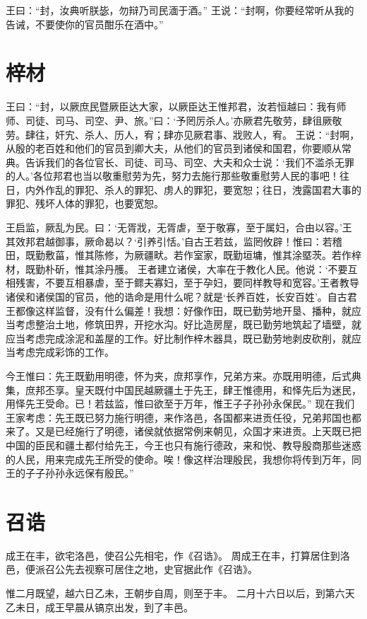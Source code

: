 \documentclass[a4paper,12pt,UTF8,twoside]{ctexbook}
\begin{document}
王曰：“封，汝典听朕毖，勿辩乃司民湎于酒。”
王说：“封啊，你要经常听从我的告诫，不要使你的官员酣乐在酒中。”

\chapter{梓材}

王曰：“封，以厥庶民暨厥臣达大家，以厥臣达王惟邦君，汝若恒越曰：我有师师、司徒、司马、司空、尹、旅。”曰：‘予罔厉杀人。’亦厥君先敬劳，肆徂厥敬劳。肆往，奸宄、杀人、历人，宥；肆亦见厥君事、戕败人，宥。
王说：“封啊，从殷的老百姓和他们的官员到卿大夫，从他们的官员到诸侯和国君，你要顺从常典。告诉我们的各位官长、司徒、司马、司空、大夫和众士说：‘我们不滥杀无罪的人。’各位邦君也当以敬重慰劳为先，努力去施行那些敬重慰劳人民的事吧！往日，内外作乱的罪犯、杀人的罪犯、虏人的罪犯，要宽恕；往日，洩露国君大事的罪犯、残坏人体的罪犯，也要宽恕。

王启监，厥乱为民。曰：‘无胥戕，无胥虐，至于敬寡，至于属妇，合由以容。’王其效邦君越御事，厥命曷以？‘引养引恬。’自古王若兹，监罔攸辟！惟曰：若稽田，既勤敷菑，惟其陈修，为厥疆畎。若作室家，既勤垣墉，惟其涂塈茨。若作梓材，既勤朴斫，惟其涂丹雘。
王者建立诸侯，大率在于教化人民。他说：‘不要互相残害，不要互相暴虐，至于鳏夫寡妇，至于孕妇，要同样教导和宽容。’王者教导诸侯和诸侯国的官员，他的诰命是用什么呢？就是‘长养百姓，长安百姓’。自古君王都像这样监督，没有什么偏差！我想：好像作田，既已勤劳地开垦、播种，就应当考虑整治土地，修筑田界，开挖水沟。好比造房屋，既已勤劳地筑起了墙壁，就应当考虑完成涂泥和盖屋的工作。好比制作梓木器具，既已勤劳地剥皮砍削，就应当考虑完成彩饰的工作。

今王惟曰：先王既勤用明德，怀为夹，庶邦享作，兄弟方来。亦既用明德，后式典集，庶邦丕享。皇天既付中国民越厥疆土于先王，肆王惟德用，和怿先后为迷民，用怿先王受命。已！若兹监，惟曰欲至于万年，惟王子子孙孙永保民。”
现在我们王家考虑：先王既已努力施行明德，来作洛邑，各国都来进贡任役，兄弟邦国也都来了。又是已经施行了明德，诸侯就依据常例来朝见，众国才来进贡。上天既已把中国的臣民和疆土都付给先王，今王也只有施行德政，来和悦、教导殷商那些迷惑的人民，用来完成先王所受的使命。唉！像这样治理殷民，我想你将传到万年，同王的子子孙孙永远保有殷民。”

\chapter{召诰}

成王在丰，欲宅洛邑，使召公先相宅，作《召诰》。
周成王在丰，打算居住到洛邑，便派召公先去视察可居住之地，史官据此作《召诰》。

惟二月既望，越六日乙未，王朝步自周，则至于丰。
二月十六日以后，到第六天乙未日，成王早晨从镐京出发，到了丰邑。
\end{document}

